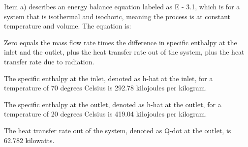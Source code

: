 Item a) describes an energy balance equation labeled as E - 3.1, which is for a system that is isothermal and isochoric, meaning the process is at constant temperature and volume. The equation is:

Zero equals the mass flow rate times the difference in specific enthalpy at the inlet and the outlet, plus the heat transfer rate out of the system, plus the heat transfer rate due to radiation.

The specific enthalpy at the inlet, denoted as h-hat at the inlet, for a temperature of 70 degrees Celsius is 292.78 kilojoules per kilogram.

The specific enthalpy at the outlet, denoted as h-hat at the outlet, for a temperature of 20 degrees Celsius is 419.04 kilojoules per kilogram.

The heat transfer rate out of the system, denoted as Q-dot at the outlet, is 62.782 kilowatts.